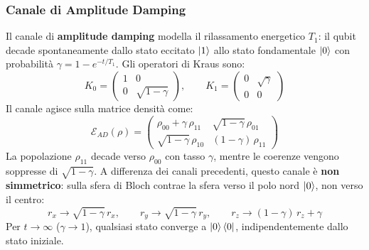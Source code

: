 \subsubsection{Canale di Amplitude Damping}

Il canale di \textbf{amplitude damping} modella il rilassamento energetico $T_1$: il qubit decade spontaneamente dallo stato eccitato $\ket{1}$ allo stato fondamentale $\ket{0}$ con probabilità $\gamma = 1-e^{-t/T_1}$. Gli operatori di Kraus sono:
\begin{equation}
    K_0 = \begin{pmatrix}1 & 0 \\ 0 & \sqrt{1-\gamma}\end{pmatrix}, \qquad
    K_1 = \begin{pmatrix}0 & \sqrt{\gamma} \\ 0 & 0\end{pmatrix}
    \label{eq:kraus_ad}
\end{equation}
Il canale agisce sulla matrice densità come:
\begin{equation}
    \mathcal{E}_{AD}\!(\rho) = \begin{pmatrix}
        \rho_{00} + \gamma\,\rho_{11} & \sqrt{1-\gamma}\,\rho_{01} \\
        \sqrt{1-\gamma}\,\rho_{10}   & (1-\gamma)\,\rho_{11}
    \end{pmatrix}
    \label{eq:amp_damping_explicit}
\end{equation}
La popolazione $\rho_{11}$ decade verso $\rho_{00}$ con tasso $\gamma$, mentre le coerenze vengono soppresse di $\sqrt{1-\gamma}$. A differenza dei canali precedenti, questo canale è \textbf{non simmetrico}: sulla sfera di Bloch contrae la sfera verso il polo nord $\ket{0}$, non verso il centro:
\begin{equation}
    r_x \to \sqrt{1-\gamma}\,r_x, \qquad r_y \to \sqrt{1-\gamma}\,r_y, \qquad r_z \to (1-\gamma)\,r_z + \gamma
\end{equation}
Per $t \to \infty$ ($\gamma \to 1$), qualsiasi stato converge a $\ket{0}\bra{0}$, indipendentemente dallo stato iniziale.
